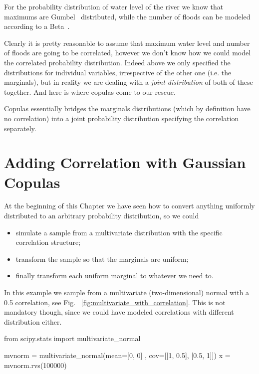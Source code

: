 For the probability distribution of water level of the river we know that maximums are Gumbel~\cite{bib:gumbel} distributed, while the number of floods can be modeled according to a Beta~\cite{bib:beta}.

Clearly it is pretty reasonable to assume that maximum water level and number of floods are going to be correlated, however we don't know how we could model the correlated probability distribution.
Indeed above we only specified the distributions for individual variables, irrespective of the other one (i.e. the marginals), but in reality we are dealing with a \emph{joint distribution} of both of these together. And here is where copulas come to our rescue.

Copulas essentially bridges the marginals distributions (which by definition have no correlation) into a joint probability distribution specifying the correlation separately. 

\section{Adding Correlation with Gaussian Copulas}
\label{adding-correlation-with-gaussian-copulas}

At the beginning of this Chapter we have seen how to convert anything uniformly distributed to an arbitrary probability distribution, so we could
\begin{itemize}
\tightlist
\item
  simulate a sample from a multivariate distribution with the specific correlation structure;
\item
  transform the sample so that the marginals are uniform;
\item
  finally transform each uniform marginal to whatever we need to.
\end{itemize}

In this example we sample from a multivariate (two-dimensional) normal with a 0.5 correlation, see Fig.~ \ref{fig:multivariate_with_correlation}. This is not mandatory though, since we could have modeled correlations with different distribution either.

\begin{ipython}
from scipy.stats import multivariate_normal

mvnorm = multivariate_normal(mean=[0, 0] , cov=[[1, 0.5],
                                                [0.5, 1]])
x = mvnorm.rvs(100000)
\end{ipython}

